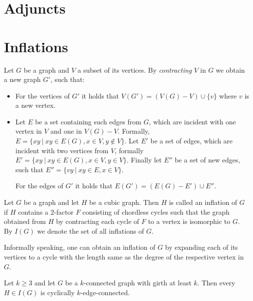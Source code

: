 \documentclass[12pt, twoside]{book}
\begin{document}

\section{Adjuncts}

\todo{}

\section{Inflations}\label{sec:inflations}

Let $G$ be a graph and $V$ a subset of its vertices. By \textit{contracting} $V$ in $G$ we obtain a new graph $G'$, such that:
\begin{itemize}
	\item For the vertices of $G'$ it holds that $V(G') = (V(G)-V)\cup \{v\}$ where $v$ is a new vertex.
	\item Let $E$ be a set containing such edges from $G$, which are incident with one vertex in $V$ and one in $V(G)-V$. Formally, ${E=\{xy~|~xy\in E(G), x\in V, y\notin V\}}$. Let $E'$ be a set of edges, which are incident with two vertices from $V$, formally ${E'=\{xy ~|~ xy\in E(G), x\in V, y\in V\}}$. Finally let $E''$ be a set of new edges, such that $E''=\{vy~|~ xy\in E, x\in V\}$.
	
	For the edges of $G'$ it holds that ${E(G')=(E(G)-E')\cup E''}$.
\end{itemize}

\begin{definition}
	Let $G$ be a graph and let $H$ be a cubic graph. Then $H$ is called an inflation of $G$ if $H$ contains a 2-factor $F$ consisting of chordless cycles such that the graph obtained from $H$ by contracting each cycle of $F$ to a vertex is isomorphic to $G$. By $I(G)$ we denote the set of all inflations of $G$.
\end{definition}

Informally speaking, one can obtain an inflation of $G$ by expanding each of its vertices to a cycle with the length same as the degree of the respective vertex in $G$.

\begin{theorem}\label{th:inflations-cyclic-connectivity}
	Let $k \geq 3$ and let $G$ be a $k$-connected graph with girth at least $k$. Then every $H \in I(G)$ is cyclically $k$-edge-connected.
\end{theorem}
\end{document}
